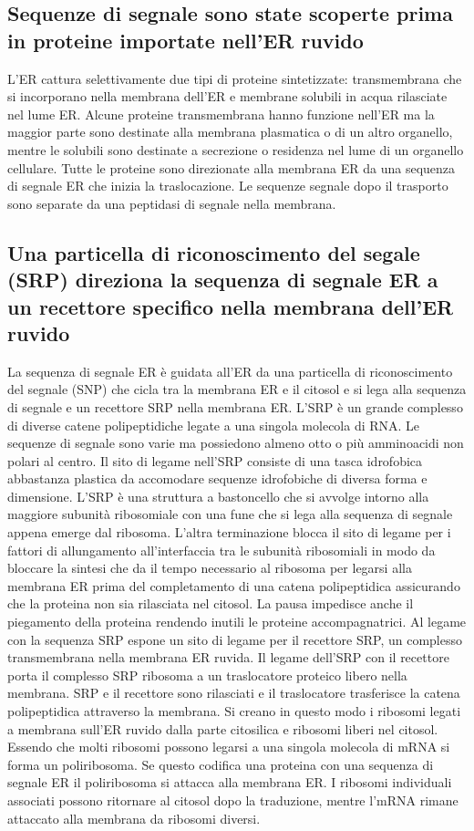 \subsection{Sequenze di segnale sono state scoperte prima in proteine importate nell'ER ruvido}
L'ER cattura selettivamente due tipi di proteine sintetizzate: transmembrana che si incorporano nella membrana dell'ER e membrane solubili in acqua rilasciate nel lume ER. Alcune 
proteine transmembrana hanno funzione nell'ER ma la maggior parte sono destinate alla membrana plasmatica o di un altro organello, mentre le solubili sono destinate a secrezione o 
residenza nel lume di un organello cellulare. Tutte le proteine sono direzionate alla membrana ER da una sequenza di segnale ER che inizia la traslocazione. Le sequenze segnale
dopo il trasporto sono separate da una peptidasi di segnale nella membrana. 
\subsection{Una particella di riconoscimento del segale (SRP) direziona la sequenza di segnale ER a un recettore specifico nella membrana dell'ER ruvido}
La sequenza di segnale ER \`e guidata all'ER da una particella di riconoscimento del segnale (SNP) che cicla tra la membrana ER e il citosol e si lega alla sequenza di segnale e un 
recettore SRP nella membrana ER. L'SRP \`e un grande complesso di diverse catene polipeptidiche legate a una singola molecola di RNA. Le sequenze di segnale sono varie ma possiedono 
almeno otto o pi\`u amminoacidi non polari al centro. Il sito di legame nell'SRP consiste di una tasca idrofobica abbastanza plastica da accomodare sequenze idrofobiche di diversa
forma e dimensione. L'SRP \`e una struttura a bastoncello che si avvolge intorno alla maggiore subunit\`a ribosomiale con una fune che si lega alla sequenza di segnale appena emerge 
dal ribosoma. L'altra terminazione blocca il sito di legame per i fattori di allungamento all'interfaccia tra le subunit\`a ribosomiali in modo da bloccare la sintesi che
da il tempo necessario al ribosoma per legarsi alla membrana ER prima del completamento di una catena polipeptidica assicurando che la proteina non sia rilasciata nel citosol. La pausa
impedisce anche il piegamento della proteina rendendo inutili le proteine accompagnatrici. Al legame con la sequenza SRP espone un sito di legame per il recettore SRP, un complesso
transmembrana nella membrana ER ruvida. Il legame dell'SRP con il recettore porta il complesso SRP ribosoma a un traslocatore proteico libero nella membrana. SRP e il recettore sono
rilasciati e il traslocatore trasferisce la catena polipeptidica attraverso la membrana. Si creano in questo modo i ribosomi legati a membrana sull'ER ruvido dalla parte citosilica e
ribosomi liberi nel citosol. Essendo che molti ribosomi possono legarsi a una singola molecola di mRNA si forma un poliribosoma. Se questo codifica una proteina con una sequenza di 
segnale ER il poliribosoma si attacca alla membrana ER. I ribosomi individuali associati possono ritornare al citosol dopo la traduzione, mentre l'mRNA rimane attaccato alla membrana
da ribosomi diversi.

